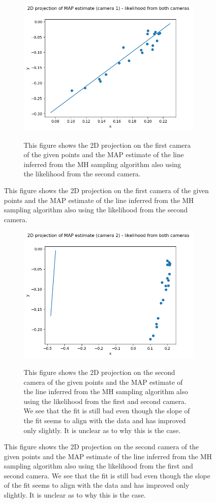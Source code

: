\documentclass[10pt]{article}
\begin{document}
\begin{figure}[h!]
\centering
\begin{subfigure}[]{.50\textwidth}
\includegraphics[width=1\linewidth]{figures/cam12.png}
  \label{fig:cam12}
\caption{This figure shows the 2D projection on the first camera of the given points and the MAP estimate of the line inferred from the MH sampling algorithm also using the likelihood from the second camera. }
\end{subfigure}
\end{figure}

\begin{figure}[h!]
\centering
\begin{subfigure}[]{.50\textwidth}
\includegraphics[width=1\linewidth]{figures/cam21.png}
  \label{fig:cam21}
\caption{This figure shows the 2D projection on the second camera of the given points and the MAP estimate of the line inferred from the MH sampling algorithm also using the likelihood from the first and second camera. We see that the fit is still bad even though the slope of the fit seems to align with the data and has improved only slightly. It is unclear as to why this is the case.}
\end{subfigure}
\end{figure}
\end{document}
